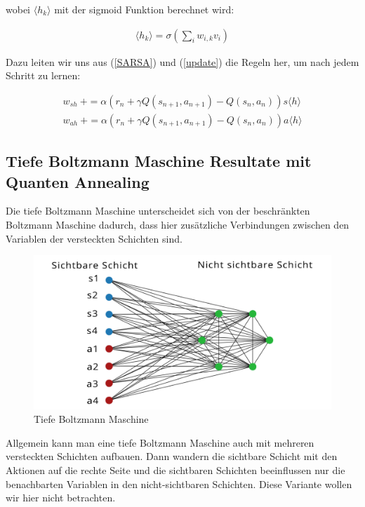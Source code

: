 wobei $\langle h_k \rangle$ mit der sigmoid Funktion berechnet wird:

\begin{align*}
	\langle h_k \rangle = \sigma (\sum_{i}w_{i,k}v_i)
\end{align*}

Dazu leiten wir uns aus (\ref{SARSA}) und (\ref{update}) die Regeln her, um nach jedem Schritt zu lernen:

\begin{align*}
	w_{sh} \: += \alpha ( r_n + \gamma Q(s_{n+1}, a_{n+1}) -  Q(s_n, a_n) ) s \langle h \rangle \\
	w_{ah} \: += \alpha ( r_n + \gamma Q(s_{n+1}, a_{n+1}) -  Q(s_n, a_n) ) a \langle h \rangle
\end{align*}

\subsection{Tiefe Boltzmann Maschine Resultate mit Quanten Annealing}
\label{subsec:dbm}

Die tiefe Boltzmann Maschine unterscheidet sich von der beschränkten Boltzmann Maschine dadurch, dass hier zusätzliche Verbindungen zwischen den Variablen der versteckten Schichten sind.

\begin{figure}[hbt!]
\centering
\includegraphics[width=\textwidth]{Figures/dbm.png}
\caption{Tiefe Boltzmann Maschine}
\label{police}
\end{figure}

Allgemein kann man eine tiefe Boltzmann Maschine auch mit mehreren versteckten Schichten aufbauen. Dann wandern die sichtbare Schicht mit den Aktionen auf die rechte Seite und die sichtbaren Schichten beeinflussen nur die benachbarten Variablen in den nicht-sichtbaren Schichten. Diese Variante wollen wir hier nicht betrachten.


